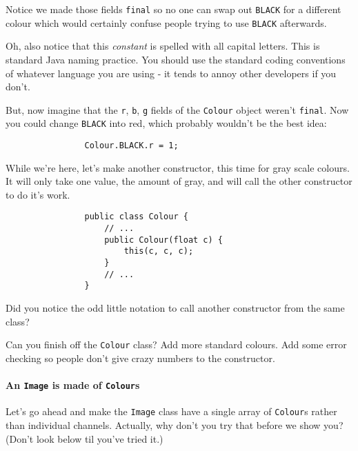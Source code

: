 \documentclass{article}
\begin{document}
            Notice we made those fields \texttt{final} so no one can swap out \texttt{BLACK} for a different colour which would certainly
            confuse people trying to use \texttt{BLACK} afterwards.
        
            Oh, also notice that this \emph{constant} is spelled with all capital letters. This is standard Java naming practice. You
            should use the standard coding conventions of whatever language you are using - it tends to annoy other developers if you don't.
        
            But, now imagine that the \texttt{r}, \texttt{b}, \texttt{g} fields of the \texttt{Colour} object weren't \texttt{final}. Now
            you could change \texttt{BLACK} into red, which probably wouldn't be the best idea:
        
            \begin{verbatim}
                Colour.BLACK.r = 1;
            \end{verbatim}
        
            While we're here, let's make another constructor, this time for gray scale colours. It will only take one value, the amount of
            gray, and will call the other constructor to do it's work.

            \begin{verbatim}
                public class Colour {
                    // ...
                    public Colour(float c) {
                        this(c, c, c);
                    }
                    // ...
                }
            \end{verbatim}
            
            Did you notice the odd little notation to call another constructor from the same class?
        
            Can you finish off the \texttt{Colour} class? Add more standard colours. Add some error checking so people don't give crazy
            numbers to the constructor.
        
        \newpage
        \paragraph{An \texttt{Image} is made of \texttt{Colour}s}
            Let's go ahead and make the \texttt{Image} class have a single array of \texttt{Colour}s rather than individual channels.
            Actually, why don't you try that before we show you? (Don't look below til you've tried it.)
            
\end{document}
